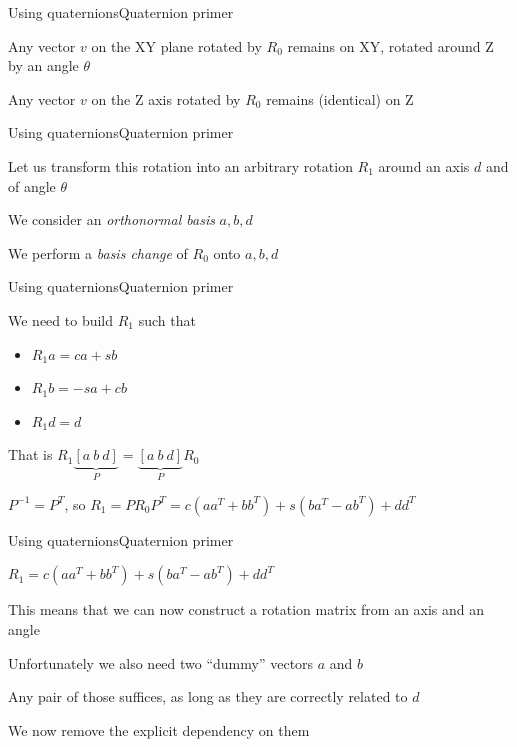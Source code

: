 \documentclass{beamer}
\begin{document}
\begin{slide}{Using quaternions}{Quaternion primer}{
\item Any vector $v$ on the XY plane rotated by $R_0$ remains on XY, rotated around Z by an angle $\theta$
\item Any vector $v$ on the Z axis rotated by $R_0$ remains (identical) on Z
}\end{slide}

\begin{slide}{Using quaternions}{Quaternion primer}{
\item Let us transform this rotation into an arbitrary rotation $R_1$ around an axis $d$ and of angle $\theta$
\item We consider an \textit{orthonormal basis} $a,b,d$
\item We perform a \textit{basis change} of $R_0$ onto $a,b,d$
}\end{slide}

\begin{slide}{Using quaternions}{Quaternion primer}{
\item We need to build $R_1$ such that
\begin{itemize}
\item $R_1 a = ca + sb$
\item $R_1 b = -sa + cb$
\item $R_1 d = d$
\end{itemize}
\item That is $R_1 \underbrace{[a\ b\ d]}_P = \underbrace{[a\ b\ d]}_P R_0$
\item $P^{-1} = P^T$, so $R_1 = P R_0 P^T = c(aa^T + bb^T) + s(ba^T - ab^T) + dd^T$
}\end{slide}

\begin{slide}{Using quaternions}{Quaternion primer}{
\item $R_1 = c(aa^T + bb^T) + s(ba^T - ab^T) + dd^T$
\item This means that we can now construct a rotation matrix from an axis and an angle
\item Unfortunately we also need two ``dummy'' vectors $a$ and $b$
\item Any pair of those suffices, as long as they are correctly related to $d$
\item We now remove the explicit dependency on them
}\end{slide}
\end{document}
